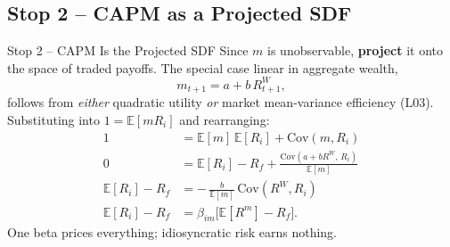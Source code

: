 \documentclass{beamer}
\newcommand{\E}{\mathbb{E}}
\newcommand{\Cov}{\mathrm{Cov}}
\begin{document}
\subsection{Stop 2 -- CAPM as a Projected SDF}

\begin{frame}{Stop 2 -- CAPM Is the Projected SDF}
Since $m$ is unobservable, \textbf{project} it onto the space of traded payoffs. The special case linear in aggregate wealth,
\[
m_{t+1}=a+b\,R^W_{t+1},
\]
follows from \emph{either} quadratic utility \emph{or} market mean-variance efficiency (L03). Substituting into $1=\E[m R_i]$ and rearranging:
\begin{align*}
1 &= \E[m]\,\E[R_i] + \Cov(m,R_i) \\
0 &= \E[R_i]-R_f + \frac{\Cov(a+bR^W,\,R_i)}{\E[m]} \\
\E[R_i]-R_f &= -\,\frac{b}{\E[m]}\,\Cov(R^W,R_i) \\
\E[R_i]-R_f &= \beta_{im}\big[\E[R^m]-R_f\big].
\end{align*}
\alert{One beta} prices everything; idiosyncratic risk earns nothing.
\end{frame}
\end{document}
